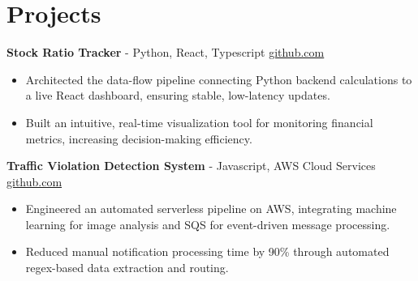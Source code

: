 \documentclass[11pt]{article}       %
\begin{document}

\vspace{-18.5pt}

\section*{Projects}

\textbf{Stock Ratio Tracker}{ - Python, React, Typescript} \hfill \href{https://github.com/Monica20030707/tradingDashboard-UI}{github.com} \\
\vspace{-9pt}
\begin{itemize}
  \item Architected the data-flow pipeline connecting Python backend calculations to a live React dashboard, ensuring stable, low-latency updates. 
  \item Built an intuitive, real-time visualization tool for monitoring financial metrics, increasing decision-making efficiency.
\end{itemize}

\textbf{Traffic Violation Detection System}{ - Javascript, AWS Cloud Services} \hfill \href{https://github.com/Monica20030707/AWS_rekonigition-N-read-database}{github.com} \\
\vspace{-9pt}
\begin{itemize}
  \item Engineered an automated serverless pipeline on AWS, integrating machine learning for image analysis and SQS for event-driven message processing.
  \item Reduced manual notification processing time by 90\% through automated regex-based data extraction and routing.
\end{itemize}
\end{document}
